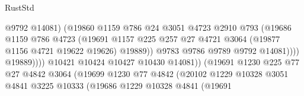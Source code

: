 \begin{lexlean}{RustStd}
\begin{coremodule}
                                              @9792
                                              @14081)
                                            (@19860
                                              @1159
                                              @786
                                              @24
                                              @3051
                                              @4723
                                              @2910
                                              @793
                                              (@19686
                                                @1159
                                                @786
                                                @4723
                                                (@19691
                                                  @1157
                                                  @225
                                                  @257
                                                  @27
                                                  @4721
                                                  @3064
                                                  (@19877 @1156 @4721 @19622 @19626)
                                                  @19889))
                                              @9783
                                              @9786
                                              @9789
                                              @9792
                                              @14081))))
                                      @19889))))
                              @10421
                              @10424
                              @10427
                              @10430
                              @14081))
                          (@19691
                            @1230
                            @225
                            @77
                            @27
                            @4842
                            @3064
                            (@19699
                              @1230
                              @77
                              @4842
                              (@20102
                                @1229
                                @10328
                                @3051
                                @4841
                                @3225
                                @10333
                                (@19686
                                  @1229
                                  @10328
                                  @4841
                                  (@19691

\end{coremodule}
\end{lexlean}
